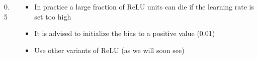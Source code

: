 \begin{frame}
	\begin{columns}
		\begin{column} {0.5\textwidth}
			\begin{center}
				
			\end{center}
				
		\end{column}
		\begin{column}{0.5\textwidth}
			\begin{itemize}
				\justifying
				\item<1-> In practice a large fraction of ReLU units can die if the learning rate is set too high
				\item<2-> It is advised to initialize the bias to a positive value (0.01)
				\item<3-> Use other variants of ReLU (as we will soon see)
			\end{itemize}
			
		\end{column}
		
	\end{columns}
\end{frame}



